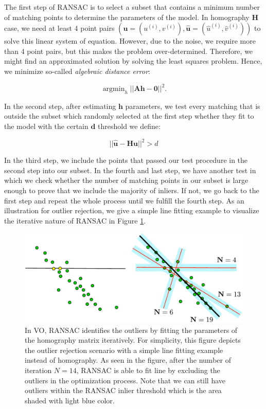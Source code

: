 \documentclass[a4paper]{report}
\numberwithin{figure}{section}
\newcommand{\argmin}{\mathop{\mathrm{argmin}}}
\begin{document}
\begin{appendices}
The first step of RANSAC is to select a subset that contains a minimum number 
of matching points to determine the parameters of the model. In homography 
$\mathbf{H}$ case, we need at least 4 point pairs 
$(\mathbf{u}=(u^{(i)},v^{(i)}),\mathbf{\hat{u}}=(\hat{u}^{(i)},\hat{v}^{(i)}))$
to solve this linear system of equation. However, due to the noise, we 
require more than 4 point pairs, but this makes the problem over-determined. 
Therefore, we might find an approximated solution by solving the least squares 
problem. Hence, we minimize so-called \textit{algebraic distance error}:

\begin{equation}
\argmin_h || \mathbf{Ah-0}||^2.
\end{equation}

In the second step, after estimating $\mathbf{h}$ parameters, we test every 
matching that is outside the subset which randomly selected at the first 
step whether they fit to the model with the certain $\mathbf{d}$ threshold we 
define:

\begin{equation}
||\mathbf{\hat{u}} - \mathbf{H}\mathbf{u}||^2 > d
\end{equation}

In the third step, we include the points that passed our test procedure in the 
second step into our subset. In the fourth and last step, we have another test 
in 
which 
we check whether the number of matching points in our subset is large enough 
to prove that we include the majority of inliers. If not, we go back to 
the first step and repeat the whole process until we fulfill the fourth step. 
As an illustration for outlier rejection, we give a simple line fitting 
example to 
visualize the iterative nature of RANSAC in Figure \ref{fig:outlier_matches}.

\begin{figure}[H]
	\centering
	\includegraphics[width=0.8\linewidth,natwidth=640,natheight=640]
	{fig/drawings/ransac.pdf}
	\caption[Outlier Rejection with RANSAC]
	{In VO, RANSAC identifies the outliers by fitting the parameters of the 
		homography matrix iteratively.  For simplicity, this figure depicts 
		the 
		outlier 
		rejection scenario with a simple line fitting example instead of 
		homography. As seen in the figure, after the number of iteration 
		$N=14$, 
		RANSAC is able to fit line by excluding the outliers in the 
		optimization 
		process. Note that we can still have outliers within the RANSAC inlier 
		threshold which is the area shaded with light blue color.} 
	\label{fig:outlier_matches}
\end{figure}



\end{appendices}
\end{document}
